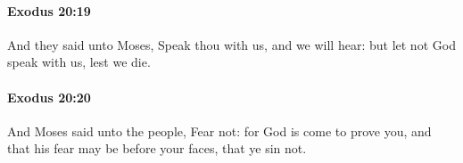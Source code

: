 		\paragraph{Exodus 20:19} %
			\label{EXODUS-20-19}

			And they said unto Moses, Speak thou with us, and we will hear: but let not God speak with us, lest we die.


		\paragraph{Exodus 20:20} %
			\label{EXODUS-20-20}

			And Moses said unto the people, Fear not: for God is come to prove you, and that his fear may be before your faces, that ye sin not.


